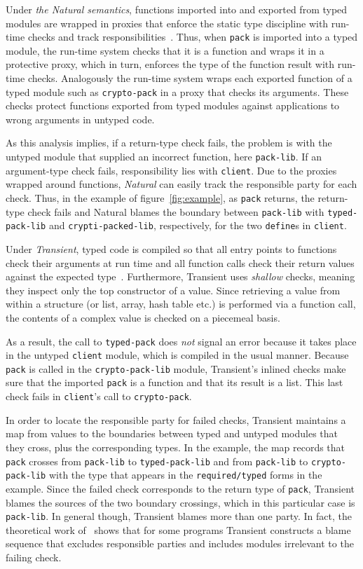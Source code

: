 Under {\it the Natural semantics\/}, functions imported into and exported from
typed modules are wrapped in proxies that enforce the static type discipline
with run-time checks and track responsibilities~\citep{tf-popl-2008,
tfffgksst-snapl-2017}. Thus, when {\tt pack} is imported into a typed module,
the run-time system checks that it is a function and wraps it in a protective
proxy, which in turn, enforces the type of the function result with run-time checks.
Analogously the run-time system wraps each exported function of a typed module
such as {\tt crypto-pack} in a proxy that checks its arguments.  These checks
protect functions exported from typed modules against applications to
wrong arguments in untyped code.

As this analysis implies, if a return-type check fails, the problem is with
the untyped module that supplied an incorrect function, here {\tt pack-lib}. If
an argument-type check fails, responsibility lies with {\tt client}. Due to the
proxies wrapped around functions, {\it Natural\/} can easily track the responsible party
for each check. Thus, in the example of figure~\ref{fig:example}, as
\texttt{pack} returns, the return-type check fails and Natural blames
the boundary between \texttt{pack-lib} with {\tt typed-pack-lib} and
{\tt crypti-packed-lib}, respectively, for the two {\tt define}s in {\tt client}.

Under {\it Transient\/}, typed code is compiled so that all entry points to
functions check their arguments at run time and all function calls check their
return values against the expected type~\citep{vss-popl-2017}.  Furthermore,
Transient uses \emph{shallow} checks, meaning they inspect only the top
constructor of a value. Since retrieving a value from within a structure (or
list, array, hash table etc.) is performed via a function call, the contents of
a complex value is checked on a piecemeal basis.

As a result, the call to \texttt{typed-pack} does {\em not\/} signal an error
because it takes place in the untyped {\tt client} module, which is compiled in
the usual manner. Because {\tt pack} is called in the {\tt crypto-pack-lib}
module, Transient's inlined checks make sure that the imported
\texttt{pack} is a function and that its result is a list. This
last check fails in \texttt{client}'s call to {\tt crypto-pack}.

In order to locate the responsible party for failed checks, Transient
maintains a map from values to the boundaries between typed and untyped modules that
they cross, plus the corresponding types. In the example, the map records that
\texttt{pack} crosses from \texttt{pack-lib} to {\tt typed-pack-lib} and
from {\tt pack-lib} to {\tt crypto-pack-lib} with the type that appears in the
{\tt required/typed} forms in the example. Since the failed check corresponds to
the return type of \texttt{pack}, Transient blames the sources of the two
boundary crossings, which in this particular case is \texttt{pack-lib}. In
general though, Transient blames more than one party. In fact, the theoretical
work of~\citet{gfd-oopsla-2019} shows that for some programs Transient
constructs a blame sequence that excludes responsible parties and includes modules
irrelevant to the failing check.

